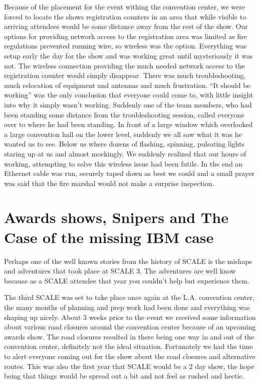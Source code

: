 Because of the placement for the event withing the convention center, we were
forced to locate the shows registration counters in an area that while visible
to arriving attendees would be some distance away from the rest of the show. 
Our options for providing network access to the registration area was limited as
fire regulations prevented running wire, so wireless was the option.  Everything
was setup early the day for the show and was working great until mysteriously it
was not.  The wireless connection providing the much needed network access to
the registration counter would simply disappear.  There was much
troubleshooting, much relocation of equipment and antennas and much frustration.
 “It should be working” was the only conclusion that everyone could come to,
with little insight into why it simply wasn’t working.  Suddenly one of the team
members, who had been standing some distance from the troubleshooting session,
called everyone over to where he had been standing.  In front of a large window
which overlooked a large convention hall on the lower level, suddenly we all saw
what it was he wanted us to see.  Below us where dozens of flashing, spinning,
pulsating lights staring up at us and almost mockingly.  
We suddenly realized that our hours of working, attempting to solve this
wireless issue had been futile.  In the end an Ethernet cable was run, securely
taped down as best we could and a small prayer was said that the fire marshal
would not make a surprise inspection.

\section*{Awards shows, Snipers and The Case of the missing IBM case}

Perhaps one of the well known stories from the history of SCALE is the mishaps
and adventures that took place at SCALE 3.  The adventures are well know because
as a SCALE attendee that year you couldn’t help but experience them.

The third SCALE was set to take place once again at the L.A. convention center,
the many months of planning and prep work had been done and everything was
shaping up nicely.  About 3 weeks prior to the event we received some
information about various road closures around the convention center because of
an upcoming  awards show.  The road closures resulted in there being one way in
and out of the convention center, definitely not the ideal situation. 
Fortunately we had the time to alert everyone coming out for the show about the
road closures and alternative routes.  This was also the first year that SCALE
would be a 2 day show, the hope being that things would be spread out a bit and
not feel as rushed and hectic.

